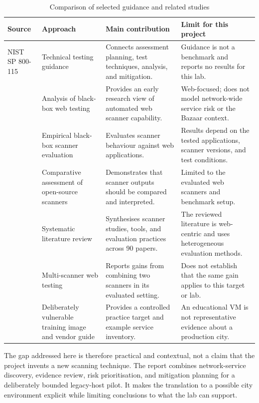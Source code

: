 \documentclass[11pt,a4paper]{article}
\begin{document}
\begin{table}[H]
\centering
\caption{Comparison of selected guidance and related studies}
\label{tab:related-work}
\small
\begin{tabularx}{\textwidth}{L{2.7cm}L{2.7cm}YY}
\toprule
\textbf{Source} & \textbf{Approach} & \textbf{Main contribution} & \textbf{Limit for this project}\\
\midrule
NIST SP 800-115 \citep{scarfone2008} & Technical testing guidance & Connects assessment planning, test techniques, analysis, and mitigation. & Guidance is not a benchmark and reports no results for this lab.\\
\citet{bau2010} & Analysis of black-box web testing & Provides an early research view of automated web scanner capability. & Web-focused; does not model network-wide service risk or the Bazaar context.\\
\citet{doupe2010} & Empirical black-box scanner evaluation & Evaluates scanner behaviour against web applications. & Results depend on the tested applications, scanner versions, and test conditions.\\
\citet{alsaleh2017} & Comparative assessment of open-source scanners & Demonstrates that scanner outputs should be compared and interpreted. & Limited to the evaluated web scanners and benchmark setup.\\
\citet{alazmi2022} & Systematic literature review & Synthesises scanner studies, tools, and evaluation practices across 90 papers. & The reviewed literature is web-centric and uses heterogeneous evaluation methods.\\
\citet{abdulghaffar2023} & Multi-scanner web testing & Reports gains from combining two scanners in its evaluated setting. & Does not establish that the same gain applies to this target or lab.\\
\citet{rapid7_metasploitable} & Deliberately vulnerable training image and vendor guide & Provides a controlled practice target and example service inventory. & An educational VM is not representative evidence about a production city.\\
\bottomrule
\end{tabularx}
\end{table}

The gap addressed here is therefore practical and contextual, not a claim that the project invents a new scanning technique. The report combines network-service discovery, evidence review, risk prioritisation, and mitigation planning for a deliberately bounded legacy-host pilot. It makes the translation to a possible city environment explicit while limiting conclusions to what the lab can support.
\end{document}

